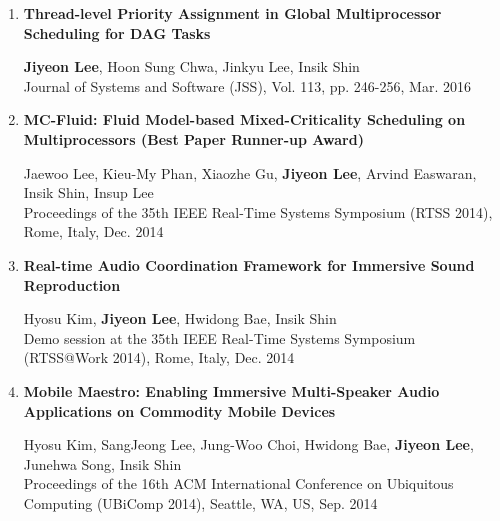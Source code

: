 \documentclass[11pt,letterpaper]{article}
\begin{document}
\begin{enumerate}
	\item \textbf{Thread-level Priority Assignment in Global Multiprocessor Scheduling for DAG Tasks} \\
	\begin{small}
		\textbf{Jiyeon Lee}, Hoon Sung Chwa, Jinkyu Lee, Insik Shin\\ 
		Journal of Systems and Software (JSS), Vol. 113, pp. 246-256, Mar. 2016
	\end{small}

	\item \textbf{MC-Fluid: Fluid Model-based Mixed-Criticality Scheduling on Multiprocessors (Best Paper Runner-up Award)} \\
	\begin{small}
		Jaewoo Lee, Kieu-My Phan, Xiaozhe Gu, \textbf{Jiyeon Lee}, Arvind Easwaran, Insik Shin, Insup Lee\\ 
		Proceedings of the 35th IEEE Real-Time Systems Symposium (RTSS 2014), Rome, Italy, Dec. 2014
	\end{small}

	\item \textbf{Real-time Audio Coordination Framework for Immersive Sound Reproduction} \\
	\begin{small}
		Hyosu Kim, \textbf{Jiyeon Lee}, Hwidong Bae, Insik Shin\\ 
		Demo session at the 35th IEEE Real-Time Systems Symposium (RTSS@Work 2014), Rome, Italy, Dec. 2014
	\end{small}

	\item \textbf{Mobile Maestro: Enabling Immersive Multi-Speaker Audio Applications on Commodity Mobile Devices} \\
	\begin{small}
		Hyosu Kim, SangJeong Lee, Jung-Woo Choi, Hwidong Bae, \textbf{Jiyeon Lee}, Junehwa Song, Insik Shin\\ 
		Proceedings of the 16th ACM International Conference on Ubiquitous Computing (UBiComp 2014), Seattle, WA, US, Sep. 2014
	\end{small}

\end{enumerate}
\end{document}
